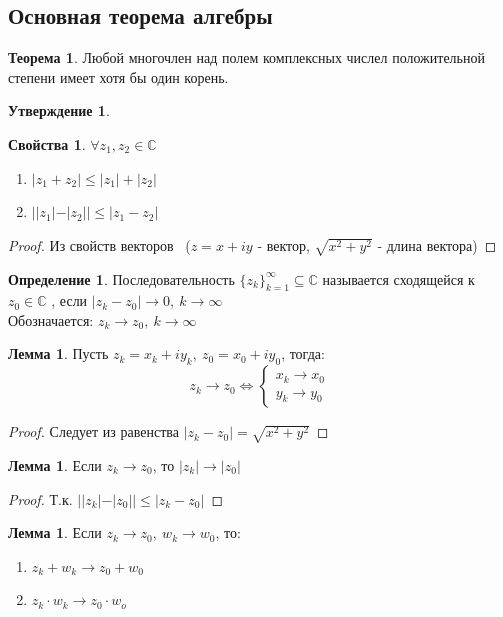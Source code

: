 \documentclass[a4paper, 12pt]{article}
\newcommand\tab[1][.5cm]{\hspace*{#1}}
\newcounter{lemcount}
\newcounter{lemcount2}
\theoremstyle{definition}
\newtheorem*{definition}{Определение}
\newtheorem*{theorem}{Теорема}
\newtheorem*{subtheorem}{Утверждение}
\newtheorem*{properties}{Свойства}
\newtheorem{lemmanum}[lemcount]{Лемма}
\begin{document}
  \subsection{Основная теорема алгебры}
  \begin{theorem}
    Любой многочлен над полем комплексных числел положительной степени имеет хотя бы один корень.
  \end{theorem}
  \begin{subtheorem}\tab
    \begin{properties}\tab
      $\forall z_1, z_2 \in \mathbb{C}$
      \begin{enumerate} 
        \item $|z_1+z_2|\leq |z_1| + |z_2|$
        \item $||z_1|-|z_2||\leq |z_1-z_2|$ 
      \end{enumerate}
      \begin{proof}
        Из свойств векторов \ ($z = x+iy$ - вектор, $\sqrt{x^2+y^2}$ - длина вектора)
      \end{proof} 
    \end{properties}
  \end{subtheorem}
  \begin{definition}
    Последовательность $\{z_k\}_{k=1}^{\infty} \subseteq \mathbb{C}$ называется сходящейся к $z_0 \in \mathbb{C}$ , если $|z_k-z_0| \to 0, \ k\to \infty$\\
    Обозначается: $z_k \to z_0, \ k\to \infty$ 
  \end{definition} 
  \setcounter{lemcount}{0}
  \begin{lemmanum}
    Пусть $z_k = x_k+iy_k, \ z_0 = x_0 + iy_0$, тогда:
    $$z_k \to z_0 \Longleftrightarrow \begin{cases}
      x_k \to x_0 \\
      y_k \to y_0
    \end{cases}$$  
  \end{lemmanum} 
  \begin{proof}
    Следует из равенства $|z_k-z_0| = \sqrt{x^2+y^2}$ 
  \end{proof} 
  \begin{lemmanum}
    Если $z_k \to z_0$, то $|z_k| \to |z_0|$  
  \end{lemmanum} 
  \begin{proof}
    Т.к. $||z_k|-|z_0||\leq |z_k-z_0|$ 
  \end{proof} 
  \begin{lemmanum}
    Если $z_k \to z_0, \ w_k \to w_0$, то:
    \begin{enumerate}
      \item $z_k + w_k \to z_0 + w_0$
      \item $z_k \cdot w_k \to z_0 \cdot w_o$  
    \end{enumerate}
  \end{lemmanum} 
\end{document}
